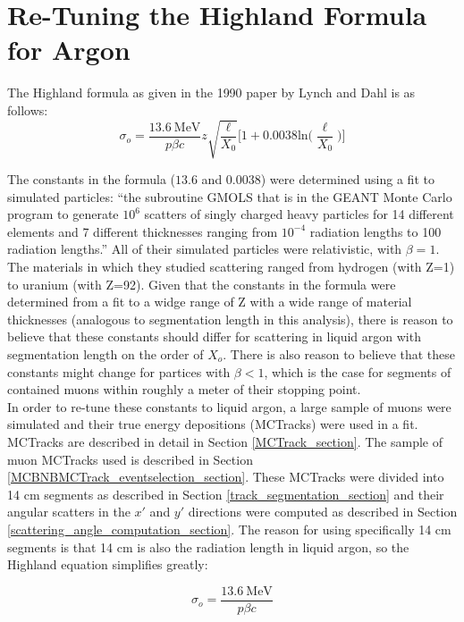 \section{Re-Tuning the Highland Formula for Argon}\label{highland_retuning_section}
The Highland formula as given in the 1990 paper by Lynch and Dahl\cite{highland-lynch-dahl} is as follows:
\begin{equation}
	\sigma_o=\frac{13.6\  \text{MeV}}{p\beta c}z\sqrt{\frac{\ell}{X_0}}\Big[1+0.0038\text{ln}\Big(\frac{\ell}{X_0}\Big)\Big]
\end{equation}

The constants in the formula ($13.6$ and $0.0038$) were determined using a fit to simulated particles: ``the subroutine GMOLS that is in the GEANT Monte Carlo program to generate $10^6$ scatters of singly charged heavy particles for 14 different elements and 7 different thicknesses ranging from $10^{-4}$ radiation lengths to 100 radiation lengths.'' All of their simulated particles were relativistic, with $\beta=1$. The materials in which they studied scattering ranged from hydrogen (with Z=1) to uranium (with Z=92). Given that the constants in the formula were determined from a fit to a widge range of Z with a wide range of material thicknesses (analogous to segmentation length in this analysis), there is reason to believe that these constants should differ for scattering in liquid argon with segmentation length on the order of $X_o$. There is also reason to believe that these constants might change for partices with $\beta < 1$, which is the case for segments of contained muons within roughly a meter of their stopping point.\\

In order to re-tune these constants to liquid argon, a large sample of muons were simulated and their true energy depositions ({\sc MCTracks}) were used in a fit. {\sc MCTracks} are described in detail in Section \ref{MCTrack_section}. The sample of muon {\sc MCTracks} used is described in Section \ref{MCBNBMCTrack_eventselection_section}. These {\sc MCTracks} were divided into 14 cm segments as described in Section \ref{track_segmentation_section} and their angular scatters in the $x'$ and $y'$ directions were computed as described in Section \ref{scattering_angle_computation_section}. The reason for using specifically 14 cm segments is that 14 cm is also the radiation length in liquid argon, so the Highland equation simplifies greatly:

\begin{equation}\label{highland_simplified}
	\sigma_o=\frac{13.6\  \text{MeV}}{p\beta c}
\end{equation}


